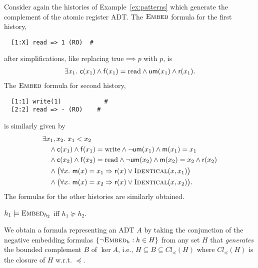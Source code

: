 \begin{example}
  \label{ex:formulas}

  Consider again the histories of Example~\ref{ex:patterns} which generate the
  complement of the atomic register ADT. The $\textsc{Embed}$ formula for the
  first history,
\begin{verbatim}
  [1:X] read => 1 (RO)  #
\end{verbatim}
  after simplifications, like replacing $\mathrm{true} \implies p$ with $p$, is
  \begin{align*}
    \exists x_1.\ {\sf c}(x_1) \land {\sf f}(x_1) = \mathrm{read} \land {\sf um}(x_1) \land {\sf r}(x_1).
  \end{align*}
  The $\textsc{Embed}$ formula for second history,
\begin{verbatim}
  [1:1] write(1)            #
  [2:2] read => - (RO)    #
\end{verbatim}
  is similarly given by
  \begin{align*}
    & \exists x_1, x_2.\ x_1 < x_2 \\
    & \quad \land {\sf c}(x_1) \land {\sf f}(x_1) = \mathrm{write}
      \land \lnot{\sf um}(x_1) \land {\sf m}(x_1) = x_1 \\
    & \quad \land {\sf c}(x_2) \land {\sf f}(x_2) = \mathrm{read}
      \land \lnot{\sf um}(x_2) \land {\sf m}(x_2) = x_2\land {\sf r}(x_2) \\
    & \quad \land \big(\forall x.\ {\sf m}(x) = x_1 \implies {\sf r}(x) \lor \textsc{Identical}(x,x_1)\big) \\
    & \quad \land \big(\forall x.\ {\sf m}(x) = x_2 \implies {\sf r}(x) \lor \textsc{Identical}(x,x_2)\big).
  \end{align*}
  The formulas for the other histories are similarly obtained.

\end{example}

\begin{lemma}\label{lem:formula1}

  $h_1 \models \textsc{Embed}_{h_2}$ if{f} $h_1 \succeq h_2$.

\end{lemma}

We obtain a formula representing an ADT $A$ by taking the conjunction of the
negative embedding formulas $\set{ \lnot\textsc{Embed}_h : h \in H }$ from any
set $H$ that \emph{generates} the bounded complement $B$ of $\ker A$, i.e.,
$H\subseteq B\subseteq Cl_\preceq(H)$ where $Cl_\preceq(H)$ is the closure of $H$ w.r.t. $\preceq$.

